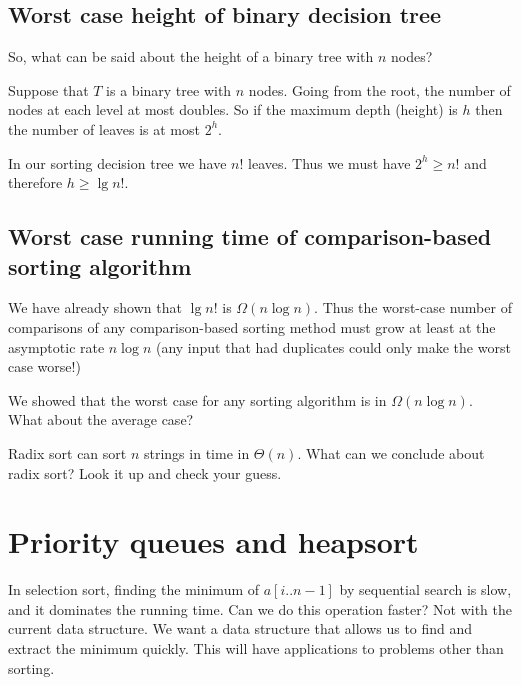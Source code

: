 \section{Worst case height of binary decision tree} 
So, what can be said about the height of a binary tree with 
$n$ nodes?

Suppose that $T$ is a binary tree with $n$ nodes. 
Going from the root, the number of nodes at each level at most doubles.
So if the maximum depth (height) is $h$ then the number of leaves is at most $2^h$. 

In our sorting decision tree we have $n!$ leaves. 
Thus we must have $2^h \geq n!$ and therefore $h \geq \lg n!$. 

\section{Worst case running time of comparison-based sorting algorithm}
We have already shown that $\lg n!$ is $\Omega (n \log n)$. Thus the
worst-case number of comparisons of any comparison-based sorting method must 
grow at least at the asymptotic rate $n \log n$ (any input that had duplicates 
could only make the worst case worse!)

\begin{Boxample}[4]
We showed that the worst case for any sorting algorithm is in $\Omega (n \log n)$. What about the average case?
\end{Boxample}

\begin{Boxample}[2]
Radix sort can sort $n$ strings in time in $\Theta(n)$.
What can we conclude about radix sort? Look it up and check your guess.
\end{Boxample}



\chapter{Priority queues and heapsort} %
\label{sec:heapsort}
In selection sort, finding the minimum of $a[i..n-1]$ by sequential search is slow, 
and it dominates the running time. 
Can we do this operation faster? Not with the current data structure. 
We want a data structure that allows us to find and extract the minimum quickly. 
This will have applications to problems other than sorting.

